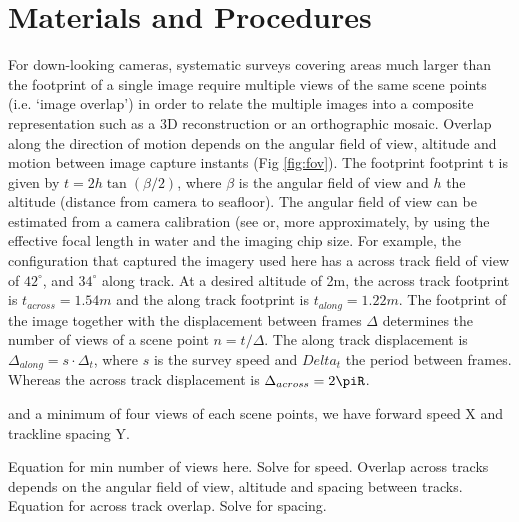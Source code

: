 \section{Materials and Procedures}


For down-looking cameras, systematic surveys covering areas much larger than the footprint of a single image require multiple views of the same scene points (i.e. `image overlap') in order to relate the multiple images into a composite representation such as a 3D reconstruction or an orthographic mosaic. Overlap along the direction of motion depends on the angular field of view, altitude and motion between image capture instants (Fig \ref{fig:fov}). The footprint footprint t is given by $t = 2 h \tan(\beta/2)$, where $\beta$ is the angular field of view and $h$ the altitude (distance from camera to seafloor). The angular field of view can be estimated from a camera calibration (see  or, more approximately, by using the effective focal length in water and the imaging chip size. For example, the configuration that captured the imagery used here has a across track field of view of $42^\circ$, and $34^\circ$ along track. At a desired altitude of 2m, the across track footprint is $t_{across}=1.54m$ and the along track footprint is $t_{along}=1.22m$. 
The footprint of the image together with the displacement between frames $\Delta$ determines the number of views of a scene point $n = t/\Delta$. The along track displacement is $\Delta_{along} = s\cdot\Delta_t$, where $s$ is the survey speed and $Delta_t$ the period between frames. Whereas the across track displacement is $\Delta_{across} = 2\piR$.

and a minimum of four views of each scene points, we have forward speed X and trackline spacing Y. 

Equation for min number of views here. Solve for speed.
Overlap across tracks depends on the angular field of view, altitude and spacing between tracks. 
Equation for across track overlap. Solve for spacing.

